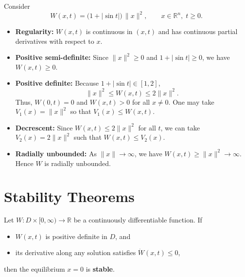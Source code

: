 \begin{example}
Consider
\begin{equation}
W(x,t) = \big(1+|\sin t|\big)\,\|x\|^2, 
\qquad x\in\mathbb{R}^n,\; t\ge 0.
\end{equation}

\begin{itemize}
    \item \textbf{Regularity:}  
    $W(x,t)$ is continuous in $(x,t)$ and has continuous partial derivatives with respect to $x$.  

    \item \textbf{Positive semi-definite:}  
    Since $\|x\|^2 \ge 0$ and $1+|\sin t|\ge 0$, we have $W(x,t)\ge 0$.  

    \item \textbf{Positive definite:}  
    Because $1+|\sin t|\in [1,2]$,  
    \begin{equation}
    \|x\|^2 \le W(x,t) \le 2\|x\|^2.
    \end{equation}
    Thus, $W(0,t)=0$ and $W(x,t)>0$ for all $x\neq 0$. One may take $V_1(x)=\|x\|^2$ so that $V_1(x)\le W(x,t)$.

    \item \textbf{Decrescent:}  
    Since $W(x,t)\le 2\|x\|^2$ for all $t$, we can take $V_2(x)=2\|x\|^2$ such that $W(x,t)\le V_2(x)$.  

    \item \textbf{Radially unbounded:}  
    As $\|x\|\to\infty$, we have $W(x,t)\ge \|x\|^2 \to\infty$. Hence $W$ is radially unbounded.  
\end{itemize}

\end{example}

\section{Stability Theorems}

\begin{theorem}
Let $W:D\times[0,\infty)\to\mathbb{R}$ be a continuously differentiable function.  
If 
\begin{itemize}
    \item $W(x,t)$ is positive definite in $D$, and  
    \item its derivative along any solution satisfies $\dot{W}(x,t)\le 0$,  
\end{itemize}
then the equilibrium $x=0$ is \textbf{stable}.
\end{theorem}


